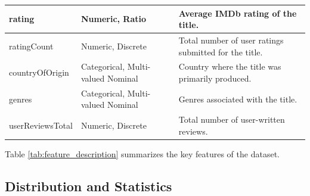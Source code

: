 \documentclass[10pt]{article}
\begin{document}
\begin{center}
\begin{longtable}{| >{\ttfamily}p{5cm} | p{4cm} | p{7cm} |}
\hline
rating & Numeric, Ratio & Average IMDb rating of the title. \\
\hline
ratingCount & Numeric, Discrete & Total number of user ratings submitted for the title. \\
\hline
countryOfOrigin & Categorical, Multi-valued Nominal & Country where the title was primarily produced. \\
\hline
genres & Categorical, Multi-valued Nominal & Genres associated with the title. \\
\hline
userReviewsTotal & Numeric, Discrete & Total number of user-written reviews. \\
\hline
\end{longtable}
\end{center}
 Table \ref{tab:feature_description} summarizes the key features of the dataset.
\subsection{Distribution and Statistics}
\end{document}
